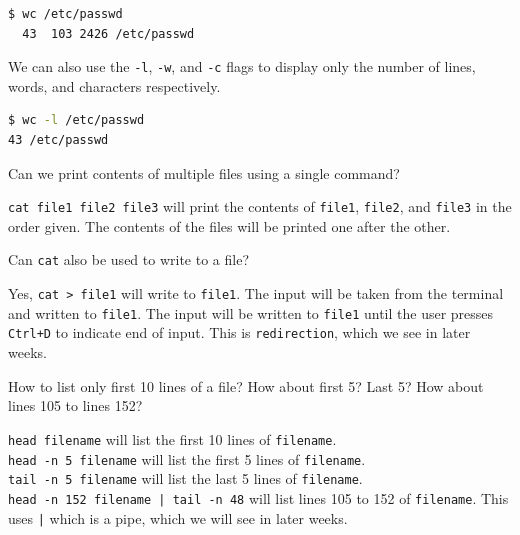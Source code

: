 \begin{lstlisting}[language=bash]
$ wc /etc/passwd
  43  103 2426 /etc/passwd
\end{lstlisting}

We can also use the \texttt{-l}, \texttt{-w}, and \texttt{-c} flags to display only the number of lines, words, and characters respectively.

\begin{lstlisting}[language=bash]
$ wc -l /etc/passwd
43 /etc/passwd
\end{lstlisting}


\begin{qs}
  Can we print contents of multiple files using a single command?
\end{qs}

\begin{ans}
  \texttt{cat file1 file2 file3} will print the contents of \texttt{file1}, \texttt{file2}, and \texttt{file3}
  in the order given. The contents of the files will be printed one after the other.
\end{ans}

\begin{qs}
  Can \texttt{cat} also be used to write to a file?
\end{qs}

\begin{ans}
  Yes, \texttt{cat > file1} will write to \texttt{file1}. The input will be taken from the
  terminal and written to \texttt{file1}. The input will be written to \texttt{file1} until
  the user presses \texttt{Ctrl+D} to indicate end of input.
  This is \texttt{redirection}, which we see in later weeks.
\end{ans}

\begin{qs}
  How to list only first 10 lines of a file? How about first 5? Last 5?
  How about lines 105 to lines 152?
\end{qs}

\begin{ans}
  \texttt{head filename} will list the first 10 lines of \texttt{filename}. \\
  \texttt{head -n 5 filename} will list the first 5 lines of \texttt{filename}. \\
  \texttt{tail -n 5 filename} will list the last 5 lines of \texttt{filename}. \\
  \texttt{head -n 152 filename | tail -n 48} will list lines 105 to 152 of \texttt{filename}.
  This uses \texttt{|} which is a pipe, which we will see in later weeks.
\end{ans}

